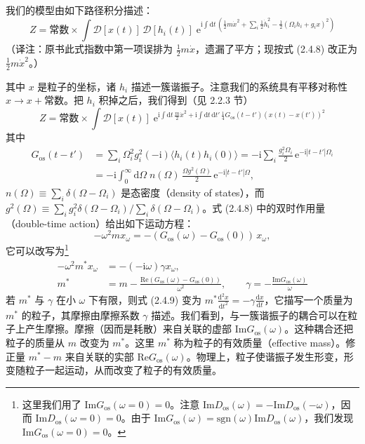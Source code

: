 我们的模型由如下路径积分描述：
\begin{equation*}
Z = \text{常数} \times \int \mathcal{D}[x(t)]\,\mathcal{D}[h_i(t)]\;\mathrm{e}^{\mathrm{i}\int \mathrm{d}t\,\left(\frac{1}{2}m\dot{x}^2 + \sum_i \frac{1}{2}\dot{h}_i^2 - \frac{1}{2}(\Omega_i h_i + g_i x)^2\right)}
\end{equation*}
（译注：原书此式指数中第一项误排为 $\frac{1}{2}m\dot{x}$，遗漏了平方；现按式 (2.4.8) 改正为 $\frac{1}{2}m\dot{x}^2$。）

其中 $x$ 是粒子的坐标，诸 $h_i$ 描述一簇谐振子。注意我们的系统具有平移对称性 $x \to x + \text{常数}$。把 $h_i$ 积掉之后，我们得到（见 2.2.3 节）
\begin{equation*}
Z = \text{常数} \times \int \mathcal{D}[x(t)]\;\mathrm{e}^{\mathrm{i}\int \mathrm{d}t\,\frac{m}{2}\dot{x}^2 + \mathrm{i}\int \mathrm{d}t\,\mathrm{d}t'\,\frac{1}{4}G_{\mathrm{os}}(t-t')(x(t)-x(t'))^2} \tag{2.4.8}
\end{equation*}
其中
\begin{align*}
G_{\mathrm{os}}(t-t') &= \sum_i \Omega_i^2 g_i^2 (-\mathrm{i})\langle h_i(t)h_i(0)\rangle = -\mathrm{i}\sum_i \frac{g_i^2\Omega_i}{2}\,\mathrm{e}^{-\mathrm{i}|t-t'|\Omega_i}\\
&= -\mathrm{i}\int_0^{\infty} \mathrm{d}\Omega\; n(\Omega)\,\frac{\Omega g^2(\Omega)}{2}\,\mathrm{e}^{-\mathrm{i}|t-t'|\Omega},
\end{align*}
$n(\Omega) \equiv \sum_i \delta(\Omega - \Omega_i)$ 是态密度（density of states），而 $g^2(\Omega) \equiv \sum_i g_i^2\delta(\Omega - \Omega_i)/\sum_i \delta(\Omega - \Omega_i)$。式 (2.4.8) 中的双时作用量（double-time action）给出如下运动方程：
\begin{equation*}
-\omega^2 m x_\omega = -(G_{\mathrm{os}}(\omega) - G_{\mathrm{os}}(0))\, x_\omega,
\end{equation*}
它可以改写为\footnote{这里我们用了 $\mathrm{Im}G_{\mathrm{os}}(\omega = 0) = 0$。注意 $\mathrm{Im}D_{\mathrm{os}}(\omega) = -\mathrm{Im}D_{\mathrm{os}}(-\omega)$，因而 $\mathrm{Im}D_{\mathrm{os}}(\omega = 0) = 0$。由于 $\mathrm{Im}G_{\mathrm{os}}(\omega) = \mathrm{sgn}(\omega)\mathrm{Im}D_{\mathrm{os}}(\omega)$，我们发现 $\mathrm{Im}G_{\mathrm{os}}(\omega = 0) = 0$。}
\begin{align*}
-\omega^2 m^* x_\omega &= -(-\mathrm{i}\omega)\gamma x_\omega, \tag{2.4.9}\\
m^* &= m - \frac{\mathrm{Re}(G_{\mathrm{os}}(\omega) - G_{\mathrm{os}}(0))}{\omega^2}, \qquad \gamma = -\frac{\mathrm{Im}G_{\mathrm{os}}(\omega)}{\omega}
\end{align*}
若 $m^*$ 与 $\gamma$ 在小 $\omega$ 下有限，则式 (2.4.9) 变为 $m^*\frac{\mathrm{d}^2x}{\mathrm{d}t^2} = -\gamma\frac{\mathrm{d}x}{\mathrm{d}t}$，它描写一个质量为 $m^*$ 的粒子，其摩擦由摩擦系数 $\gamma$ 描述。我们看到，与一簇谐振子的耦合可以在粒子上产生摩擦。摩擦（因而是耗散）来自关联的虚部 $\mathrm{Im}G_{\mathrm{os}}(\omega)$。这种耦合还把粒子的质量从 $m$ 改变为 $m^*$。这里 $m^*$ 称为粒子的有效质量（effective mass）。修正量 $m^* - m$ 来自关联的实部 $\mathrm{Re}G_{\mathrm{os}}(\omega)$。物理上，粒子使谐振子发生形变，形变随粒子一起运动，从而改变了粒子的有效质量。

